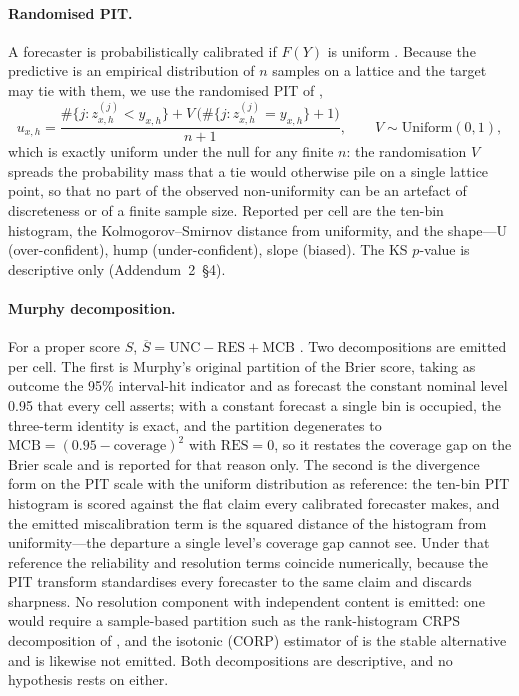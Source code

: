\paragraph{Randomised PIT.} A forecaster is probabilistically calibrated if
$F(Y)$ is uniform \citep{gneiting2007probabilistic,dawid1984present}. Because
the predictive is an empirical distribution of $n$ samples on a lattice and
the target may tie with them, we use the randomised PIT of
\citet{czado2009predictive},
\begin{equation}
  u_{x,h} = \frac{\#\{j: z^{(j)}_{x,h} < y_{x,h}\} + V\,\big(\#\{j: z^{(j)}_{x,h}=y_{x,h}\}+1\big)}{n+1},
  \qquad V\sim\mathrm{Uniform}(0,1),
\end{equation}
which is exactly uniform under the null for any finite $n$: the randomisation
$V$ spreads the probability mass that a tie would otherwise pile on a single
lattice point, so that no part of the observed non-uniformity can be an
artefact of discreteness or of a finite sample size. Reported per cell are the
ten-bin histogram, the Kolmogorov--Smirnov distance from uniformity, and the
shape---U (over-confident), hump (under-confident), slope (biased). The KS
$p$-value is descriptive only (Addendum~2~\S4).

\paragraph{Murphy decomposition.} For a proper score $S$,
$\overline{S} = \mathrm{UNC} - \mathrm{RES} + \mathrm{MCB}$
\citep{murphy1973new,pohle2020murphy}. Two decompositions are emitted per
cell. The first is Murphy's original partition of the Brier score, taking as
outcome the 95\% interval-hit indicator and as forecast the constant nominal
level 0.95 that every cell asserts; with a constant forecast a single bin is
occupied, the three-term identity is exact, and the partition degenerates to
$\mathrm{MCB}=(0.95-\text{coverage})^2$ with $\mathrm{RES}=0$, so it restates
the coverage gap on the Brier scale and is reported for that reason only. The
second is the divergence form \citep{broecker2009reliability} on the PIT scale
with the uniform distribution as reference: the ten-bin PIT histogram is
scored against the flat claim every calibrated forecaster makes, and the
emitted miscalibration term is the squared distance of the histogram from
uniformity---the departure a single level's coverage gap cannot see. Under
that reference the reliability and resolution terms coincide numerically,
because the PIT transform standardises every forecaster to the same claim and
discards sharpness. No resolution component with independent content is
emitted: one would require a sample-based partition such as the rank-histogram
CRPS decomposition of \citet{hersbach2000decomposition}, and the isotonic
(CORP) estimator of \citet{dimitriadis2021stable} is the stable alternative
and is likewise not emitted. Both decompositions are descriptive, and no
hypothesis rests on either.

